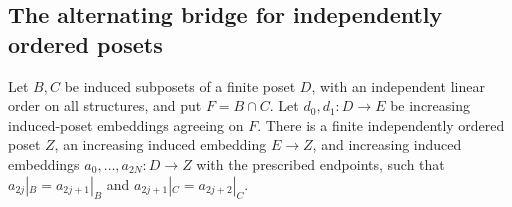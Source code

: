 \subsection{The alternating bridge for independently ordered posets}
\begin{proposition}
\label{B:poset-bridge}
Let $B,C$ be induced subposets of a finite poset $D$, with an independent
linear order on all structures, and put $F=B\cap C$. Let
$d_0,d_1:D\to E$ be increasing induced-poset embeddings agreeing on $F$.
There is a finite independently ordered poset $Z$, an increasing induced
embedding $E\to Z$, and increasing induced embeddings
$a_0,\ldots,a_{2N}:D\to Z$ with the prescribed endpoints, such that
$a_{2j}|_B=a_{2j+1}|_B$ and
$a_{2j+1}|_C=a_{2j+2}|_C$.
\end{proposition}
